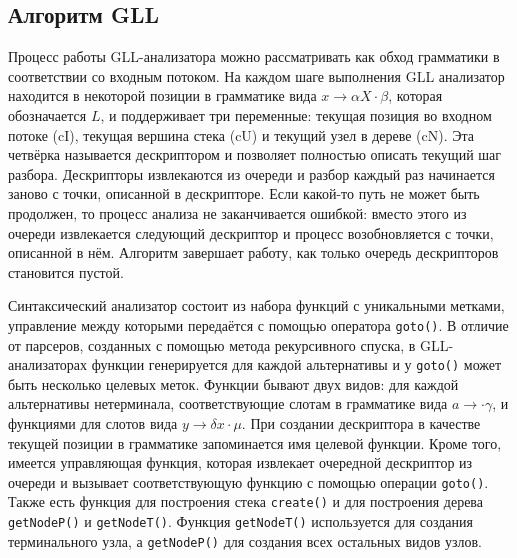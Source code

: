 \subsection{Алгоритм GLL}
Процесс работы GLL-анализатора можно рассматривать как обход грамматики в соответствии со входным потоком. На каждом шаге выполнения GLL анализатор находится в некоторой позиции в грамматике вида $x \rightarrow \alpha X \cdot \beta$, которая обозначается $L$, и поддерживает три переменные: текущая позиция во входном потоке (cI), текущая вершина стека (cU) и текущий узел в дереве (cN). Эта четвёрка называется дескриптором и позволяет полностью описать текущий шаг разбора. Дескрипторы извлекаются из очереди и разбор каждый раз начинается заново с точки, описанной в дескрипторе. Если какой-то путь не может быть продолжен, то процесс анализа не заканчивается ошибкой: вместо этого из очереди извлекается следующий дескриптор и процесс возобновляется с точки, описанной в нём. Алгоритм завершает работу, как только очередь дескрипторов становится пустой.

Синтаксический анализатор состоит из набора функций с уникальными метками, управление между которыми передаётся с помощью оператора \texttt{goto()}. В отличие от парсеров, созданных с помощью метода рекурсивного спуска, в GLL-анализаторах функции генерируется для каждой альтернативы и у \texttt{goto()} может быть несколько целевых меток. Функции бывают двух видов: для каждой альтернативы нетерминала, соответствующие слотам в грамматике вида $a \rightarrow \cdot\gamma$, и функциями для слотов вида $ y \rightarrow \delta x \cdot \mu$. При создании дескриптора в качестве текущей позиции в грамматике запоминается имя целевой функции. Кроме того, имеется управляющая функция, которая извлекает очередной дескриптор из очереди и вызывает соответствующую функцию с помощью операции \texttt{goto()}. Также есть функция для построения стека \texttt{create()} и для построения дерева \texttt{getNodeP()} и \texttt{getNodeT()}. Функция \texttt{getNodeT()} используется для создания терминального узла, а \texttt{getNodeP()} для создания всех остальных видов узлов.

